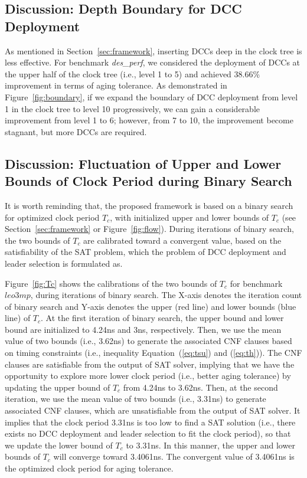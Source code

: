 \subsection{Discussion: Depth Boundary for DCC Deployment}

As mentioned in Section~\ref{sec:framework}, inserting DCCs deep in the clock tree is less effective. For benchmark \textit{des\_perf}, we considered the deployment of DCCs at the upper half of the clock tree (i.e., level 1 to 5) and achieved 38.66\% improvement in terms of aging tolerance. As demonstrated in Figure~\ref{fig:boundary}, if we expand the boundary of DCC deployment from level 1 in the clock tree to level 10 progressively, we can gain a considerable improvement from level 1 to 6; however, from 7 to 10, the improvement become stagnant, but more DCCs are required.

\subsection{Discussion: Fluctuation of Upper and Lower Bounds of Clock Period during Binary Search}

It is worth reminding that, the proposed framework is based on a binary search for optimized clock period $T_{c}$, with initialized upper and lower bounds of $T_{c}$ (see Section~\ref{sec:framework} or Figure~\ref{fig:flow}). During iterations of binary search, the two bounds of $T_{c}$ are calibrated toward a convergent value, based on the satisfiability of the SAT problem, which the problem of DCC deployment and leader selection is formulated as.

Figure~\ref{fig:Tc} shows the calibrations of the two bounds of $T_{c}$ for benchmark $leo3mp$, during iterations of binary search. The X-axis denotes the iteration count of binary search and Y-axis denotes the upper (red line) and lower bounds (blue line) of $T_{c}$. At the first iteration of binary search, the upper bound and lower bound are initialized to 4.24ns and 3ns, respectively. Then, we use the mean value of two bounds (i.e., 3.62ns) to generate the associated CNF clauses based on timing constraints (i.e., inequality Equation~(\ref{eq:tsu}) and (\ref{eq:th})). The CNF clauses are satisfiable from the output of SAT solver, implying that we have the opportunity to explore more lower clock period (i.e., better aging tolerance) by updating the upper bound of $T_{c}$ from 4.24ns to 3.62ns. Then, at the second iteration, we use the mean value of two bounds (i.e., 3.31ns) to generate associated CNF clauses, which are unsatisfiable from the output of SAT solver. It implies that the clock period 3.31ns is too low to find a SAT solution (i.e., there exists no DCC deployment and leader selection to fit the clock period), so that we update the lower bound of $T_{c}$ to 3.31ns. In this manner, the upper and lower bounds of $T_{c}$ will converge toward 3.4061ns. The convergent value of 3.4061ns is the optimized clock period for aging tolerance.

